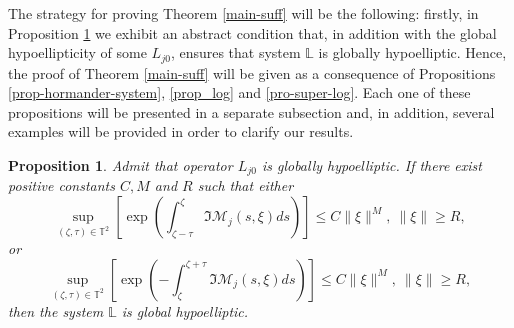 \documentclass[12pt]{elsarticle}
\newtheorem{proposition}[theorem]{Proposition}
\numberwithin{equation}{section}
\begin{document}
The strategy for proving Theorem \ref{main-suff} will be the following: firstly, in Proposition \ref{general-suff-cond} we exhi\-bit   an abstract condition that, in addition with the global hypoellipticity of some $L_{j0}$, ensures that system $\mathbb{L}$ is globally hypoelliptic. Hence, the proof of Theorem \ref{main-suff}  will be given as a consequence of Propositions \ref{prop-hormander-system}, \ref{prop_log} and \ref{pro-super-log}. Each one of these propositions will be  presented in a separate subsection and, in addition, several examples will be provided in order to clarify our results. 

\begin{proposition}\label{general-suff-cond}
	Admit that operator $L_{j0}$ is globally hypoelliptic. If there exist positive constants $C, M$ and $R$ such that either
	\begin{equation*}
	\sup_{(\zeta,\tau) \in \mathbb{T}^2} \left[\exp \left(\int_{\zeta-\tau}^{\zeta}\Im \mathcal{M}_j(s,\xi)ds \right)\right] \leq C\|\xi\|^{M} , \ \|\xi\| \geq R,
	\end{equation*}
	or
	\begin{equation*}
	\sup_{(\zeta,\tau) \in \mathbb{T}^2} \left[\exp \left(-\int_{\zeta}^{\zeta+\tau}\Im \mathcal{M}_j(s,\xi)ds \right)\right] \leq C\|\xi\|^{M},   \ \|\xi\| \geq R,
	\end{equation*}
	then the system $\mathbb{L}$  is global hypoelliptic.
\end{proposition}
\end{document}
